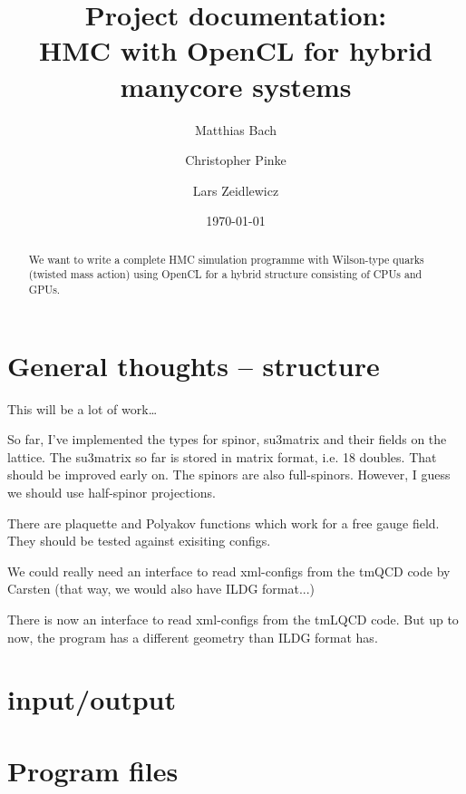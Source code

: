 \documentclass[a4paper,11pt]{article}
\title{Project documentation:\\
       \textbf{HMC with OpenCL for hybrid manycore systems}
}
\author{Matthias Bach \and Christopher Pinke \and Lars Zeidlewicz}
\date{\today}
\begin{document}
\maketitle
\begin{abstract}
We want to write a complete HMC simulation programme with Wilson-type quarks (twisted mass action) using OpenCL for a hybrid structure consisting of CPUs and GPUs.
\end{abstract}

\tableofcontents

\section{General thoughts -- structure}
This will be a lot of work\ldots

So far, I've implemented the types for spinor, su3matrix and their fields on the lattice. The su3matrix so far is stored in matrix format, i.e. 18 doubles. That should be improved early on. The spinors are also full-spinors. However, I guess we should use half-spinor projections.

There are plaquette and Polyakov functions which work for a free gauge field. They should be tested against exisiting configs.

We could really need an interface to read xml-configs from the tmQCD code by Carsten (that way, we would also have ILDG format...)

There is now an interface to read xml-configs from the tmLQCD code. But up to now, the program has a different geometry than ILDG format has. 



\section{input/output}



\section{Program files}











\end{document}
